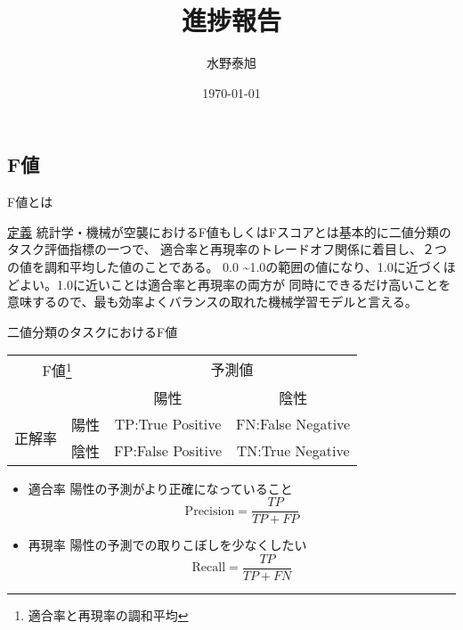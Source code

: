 \documentclass[leno,xcolor=dvipsnames]{beamer}
\title{進捗報告}
\date{\today}
\author{水野泰旭}
\institute{弘前大学理工学部電子情報工学科４年}
\begin{document}
  \maketitle

  \begin{frame}
    \section{F値}
  \end{frame}

  \begin{frame}{F値とは}
    \begin{block}{\href{https://atmarkit.itmedia.co.jp/ait/articles/2210/24/news034.html}{定義}}
      統計学・機械が空襲におけるF値もしくはFスコアとは基本的に二値分類のタスク評価指標の一つで、
      適合率と再現率のトレードオフ関係に着目し、２つの値を調和平均した値のことである。
      0.0 \textasciitilde 1.0の範囲の値になり、1.0に近づくほどよい。1.0に近いことは適合率と再現率の両方が
      同時にできるだけ高いことを意味するので、最も効率よくバランスの取れた機械学習モデルと言える。
    \end{block}
  \end{frame}

  \begin{frame}{二値分類のタスクにおけるF値}
    \begin{table}[H]
      \centering
      \begin{tabular}{cccc}
        \toprule
        \multicolumn{2}{c}{F値\footnote{適合率と再現率の調和平均}} & \multicolumn{2}{c}{予測値} \\ \cline{3-4}
        & & 陽性　& 陰性 \\
        \midrule
        \multirow{2}{*}{正解率} & 陽性 & TP:True Positive & FN:False Negative \\
        & 陰性 & FP:False Positive & TN:True Negative \\
        \bottomrule
      \end{tabular}
    \end{table}
    \begin{itemize}
      \item 適合率 \mbox{} 陽性の予測がより正確になっていること \[ \mathrm{Precision} = \frac{TP}{TP + FP} \]
      \item 再現率 \mbox{} 陽性の予測での取りこぼしを少なくしたい \[ \mathrm{Recall} = \frac{TP}{TP + FN} \]
    \end{itemize}
  \end{frame}
\end{document}
